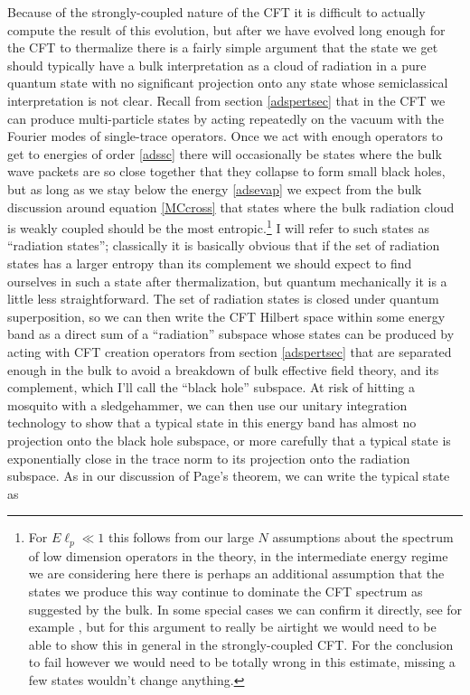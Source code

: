 \documentclass[12pt]{article}
\begin{document}
Because of the strongly-coupled nature of the CFT it is difficult to actually compute the result of this evolution, but after we have evolved long enough for the CFT to thermalize there is a fairly simple argument that the state we get should typically have a bulk interpretation as a cloud of radiation in a pure quantum state with no significant projection onto any state whose semiclassical interpretation is not clear.  Recall from section \ref{adspertsec} that in the CFT we can produce multi-particle states by acting repeatedly on the vacuum with the Fourier modes of single-trace operators.  Once we act with enough operators to get to energies of order \eqref{adssc} there will occasionally be states where the bulk wave packets are so close together that they collapse to form small black holes, but as long as we stay below the energy \eqref{adsevap} we expect from the bulk discussion around equation \eqref{MCcross} that states where the bulk radiation cloud is weakly coupled should be the most entropic.\footnote{For $E\ell_p\ll 1$ this follows from our large $N$ assumptions about the spectrum of low dimension operators in the theory, in the intermediate energy regime we are considering here there is perhaps an additional assumption that the states we produce this way continue to dominate the CFT spectrum as suggested by the bulk.  In some special cases we can confirm it directly, see for example \cite{Shenker:2011zf}, but for this argument to really be airtight we would need to be able to show this in general in the strongly-coupled CFT.  For the conclusion to fail however we would need to be totally wrong in this estimate, missing a few states wouldn't change anything.}  I will refer to such states as ``radiation states'';  classically it is basically obvious that if the set of radiation states has a larger entropy than its complement we should expect to find ourselves in such a state after thermalization, but quantum mechanically it is a little less straightforward.  The set of radiation states is closed under quantum superposition,  so we can then write the CFT Hilbert space within some energy band as a direct sum of a ``radiation'' subspace whose states can be produced by acting with CFT creation operators from section \ref{adspertsec} that are separated enough in the bulk to avoid a breakdown of bulk effective field theory, and its complement, which I'll call the ``black hole'' subspace.  At risk of hitting a mosquito with a sledgehammer, we can then use our unitary integration technology to show that a typical state in this energy band has almost no projection onto the black hole subspace, or more carefully that a typical state is exponentially close in the trace norm to its projection onto the radiation subspace.  As in our discussion of Page's theorem, we can write the typical state as
\end{document}
